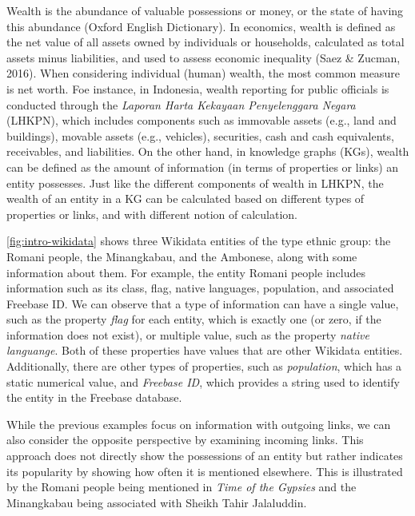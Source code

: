 Wealth is the abundance of valuable possessions or money, or the state of having this abundance (Oxford English Dictionary). In economics, wealth is defined as the net value of all assets owned by individuals or households, calculated as total assets minus liabilities, and used to assess economic inequality (Saez \& Zucman, 2016). When considering individual (human) wealth, the most common measure is net worth. Foe instance, in Indonesia, wealth reporting for public officials is conducted through the \textit{Laporan Harta Kekayaan Penyelenggara Negara} (LHKPN), which includes components such as immovable assets (e.g., land and buildings), movable assets (e.g., vehicles), securities, cash and cash equivalents, receivables, and liabilities. On the other hand, in knowledge graphs (KGs), wealth can be defined as the amount of information (in terms of properties or links) an entity possesses. Just like the different components of wealth in LHKPN, the wealth of an entity in a KG can be calculated based on different types of properties or links, and with different notion of calculation.

\autoref{fig:intro-wikidata} shows three Wikidata entities of the type ethnic group: the Romani people, the Minangkabau, and the Ambonese, along with some information about them. For example, the entity Romani people includes information such as its class, flag, native languages, population, and associated Freebase ID. We can observe that a type of information can have a single value, such as the property \textit{flag} for each entity, which is exactly one (or zero, if the information does not exist), or multiple value, such as the property \textit{native languange}. Both of these properties have values that are other Wikidata entities. Additionally, there are other types of properties, such as \textit{population}, which has a static numerical value, and \textit{Freebase ID}, which provides a string used to identify the entity in the Freebase database.

While the previous examples focus on information with outgoing links, we can also consider the opposite perspective by examining incoming links. This approach does not directly show the possessions of an entity but rather indicates its popularity by showing how often it is mentioned elsewhere. This is illustrated by the Romani people being mentioned in \textit{Time of the Gypsies} and the Minangkabau being associated with Sheikh Tahir Jalaluddin.

